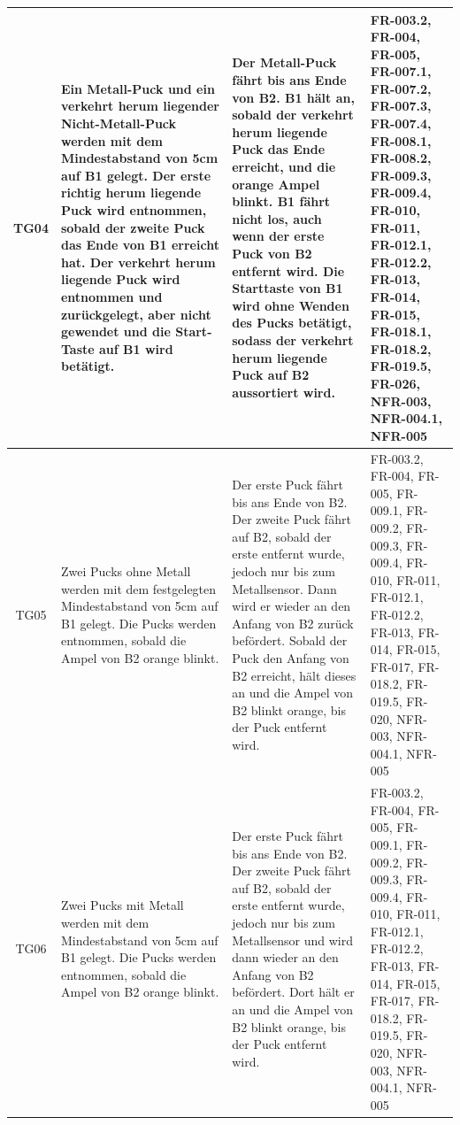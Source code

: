 \documentclass[oneside,a4paper,titlepage]{scrartcl}              %
\begin{document}
\begin{small}
\begin{center}
\begin{longtable}{|c|p{4cm}|p{6cm}|C{3cm}|}
      \hline
      TG04 & Ein Metall-Puck und ein verkehrt herum liegender Nicht-Metall-Puck werden mit dem Mindestabstand von 5cm auf B1 gelegt. Der erste richtig herum liegende Puck wird entnommen, sobald der zweite Puck das Ende von B1 erreicht hat. Der verkehrt herum liegende Puck wird entnommen und zurückgelegt, aber nicht gewendet und die Start-Taste auf B1 wird betätigt. & Der Metall-Puck fährt bis ans Ende von B2. B1 hält an, sobald der verkehrt herum liegende Puck das Ende erreicht, und die orange Ampel blinkt. B1 fährt nicht los, auch wenn der erste Puck von B2 entfernt wird.
      Die Starttaste von B1 wird ohne Wenden des Pucks betätigt, sodass der verkehrt herum liegende Puck auf B2 aussortiert wird. & FR-003.2, FR-004, FR-005, FR-007.1, FR-007.2, FR-007.3, FR-007.4, FR-008.1, FR-008.2, FR-009.3, FR-009.4, FR-010, FR-011, FR-012.1, FR-012.2, FR-013, FR-014, FR-015, FR-018.1, FR-018.2, FR-019.5, FR-026, NFR-003, NFR-004.1, NFR-005\\
      \hline
       TG05 & Zwei Pucks ohne Metall werden mit dem festgelegten Mindestabstand von 5cm auf B1 gelegt. Die Pucks werden entnommen, sobald die Ampel von B2 orange blinkt.
       & Der erste Puck fährt bis ans Ende von B2. Der zweite Puck fährt auf B2, sobald der erste entfernt wurde, jedoch nur bis zum Metallsensor. Dann wird er wieder an den Anfang von B2 zurück befördert. Sobald der Puck den Anfang von B2 erreicht, hält dieses an und die Ampel von B2 blinkt orange, bis der Puck entfernt wird. & FR-003.2, FR-004, FR-005, FR-009.1, FR-009.2, FR-009.3, FR-009.4, FR-010, FR-011, FR-012.1, FR-012.2, FR-013, FR-014, FR-015, FR-017, FR-018.2, FR-019.5, FR-020, NFR-003, NFR-004.1, NFR-005\\
      \hline
      TG06 & Zwei Pucks mit Metall werden mit dem Mindestabstand von 5cm auf B1 gelegt. Die Pucks werden entnommen, sobald die Ampel von B2 orange blinkt. & Der erste Puck fährt bis ans Ende von B2. Der zweite Puck fährt auf B2, sobald der erste entfernt wurde, jedoch nur bis zum Metallsensor und wird dann wieder an den Anfang von B2 befördert. Dort hält er an und die Ampel von B2 blinkt orange, bis der Puck entfernt wird. & FR-003.2, FR-004, FR-005, FR-009.1, FR-009.2, FR-009.3, FR-009.4, FR-010, FR-011, FR-012.1, FR-012.2, FR-013, FR-014, FR-015, FR-017, FR-018.2, FR-019.5, FR-020, NFR-003, NFR-004.1, NFR-005\\
      \hline
    \end{longtable}
  \end{center}
\end{small}
\end{document}
